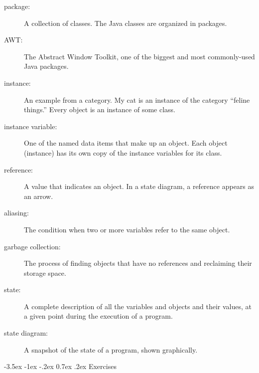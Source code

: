 \documentclass{book}
\makeatletter
\renewcommand{\section}{\@startsection 
    {section} {1} {0mm}%
    {-3.5ex \@plus -1ex \@minus -.2ex}%
    {0.7ex \@plus.2ex}%
    {\normalfont\Large\bfseries}}
\makeatother
\begin{document}
\begin{description}

\item[package:]  A collection of classes.  The Java
classes are organized in packages.

\item[AWT:]  The Abstract Window Toolkit, one of the biggest
and most commonly-used Java packages.

\item[instance:]  An example from a category.  My cat is an
instance of the category ``feline things.''  Every object is
an instance of some class.

\item[instance variable:]  One of the named data items that make
up an object.  Each object (instance) has its own copy of
the instance variables for its class.

\item[reference:]  A value that indicates an object.  In a
state diagram, a reference appears as an arrow.

\item[aliasing:] The condition when two or more variables refer
to the same object.

\item[garbage collection:]  The process of finding objects that
have no references and reclaiming their storage space.

\item[state:] A complete description of all the variables and
objects and their values, at a given point during the execution
of a program.

\item[state diagram:] A snapshot of the state of a program, shown
graphically.


\end{description}


\section{Exercises}
\end{document}
